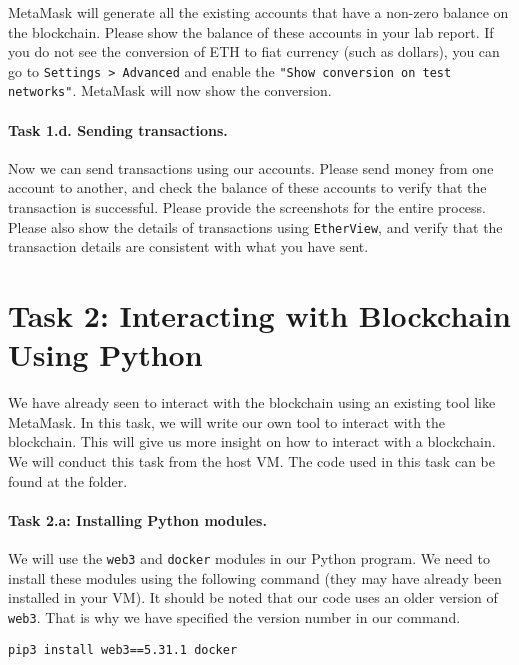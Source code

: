 MetaMask will generate all the existing accounts that have a non-zero 
balance on the blockchain. Please show the balance of these accounts in your 
lab report. 
If you do not see the conversion of ETH to fiat currency (such as dollars),
you can go to \texttt{Settings > Advanced} and enable the 
\texttt{"Show conversion on test networks"}. MetaMask will now 
show the conversion. 

 
\paragraph{Task 1.d. Sending transactions.} 
Now we can send transactions using our accounts. Please 
send money from one account to another, and 
check the balance of these accounts to verify
that the transaction is successful. 
Please provide the screenshots for the entire process. 
Please also show the 
details of transactions using \texttt{EtherView}, and 
verify that the transaction details are consistent with
what you have sent. 



\section{Task 2: Interacting with Blockchain Using Python} 

We have already seen to interact with the blockchain 
using an existing tool like MetaMask. In this task, we will write our 
own tool to interact with the blockchain. 
This will give us more insight on how to interact with 
a blockchain. We will conduct this task from the host VM. 
The code used in this task can be found at the  folder. 


\paragraph{Task 2.a: Installing Python modules.} 
We will use the \texttt{web3} and \texttt{docker} modules
in our Python program. We need to install these modules using the following 
command (they may have already been installed in your VM). 
It should be noted that our code uses an older
version of \texttt{web3}. That is why we 
have specified the version number in our command. 

\begin{lstlisting}
pip3 install web3==5.31.1 docker
\end{lstlisting}


